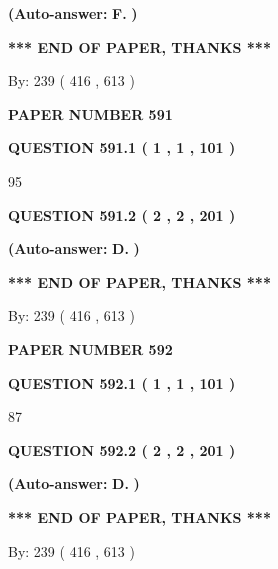 \documentclass[12pt]{article}
\begin{document}
 
{\textbf{(Auto-answer:}}
{\textbf{\large{
F.}}}
{\textbf{)}}
 
 
   
   
   
   
\vspace{1.0in} 
{\textbf{\large{ *** END OF PAPER, THANKS *** }}} 
   
   
\hspace{1.0in} By: 
 239 ( 416 ,  613 )
   
   
   
   
\newpage 
\setcounter{page}{ 
   591001 } 
   
   
 {\textbf{ \Large{ PAPER NUMBER  591  }}}
   
   
   
   
  
  
{\textbf{\large{QUESTION
591.1 
 ( 1 , 1 , 101 )
}}}

95
  
  
{\textbf{\large{QUESTION
591.2 
 ( 2 , 2 , 201 )
}}}
 
 
{\textbf{(Auto-answer:}}
{\textbf{\large{
D.}}}
{\textbf{)}}
 
 
   
   
   
   
\vspace{1.0in} 
{\textbf{\large{ *** END OF PAPER, THANKS *** }}} 
   
   
\hspace{1.0in} By: 
 239 ( 416 ,  613 )
   
   
   
   
\newpage 
\setcounter{page}{ 
   592001 } 
   
   
 {\textbf{ \Large{ PAPER NUMBER  592  }}}
   
   
   
   
  
  
{\textbf{\large{QUESTION
592.1 
 ( 1 , 1 , 101 )
}}}

87
  
  
{\textbf{\large{QUESTION
592.2 
 ( 2 , 2 , 201 )
}}}
 
 
{\textbf{(Auto-answer:}}
{\textbf{\large{
D.}}}
{\textbf{)}}
 
 
   
   
   
   
\vspace{1.0in} 
{\textbf{\large{ *** END OF PAPER, THANKS *** }}} 
   
   
\hspace{1.0in} By: 
 239 ( 416 ,  613 )
   
   
   
\end{document}

